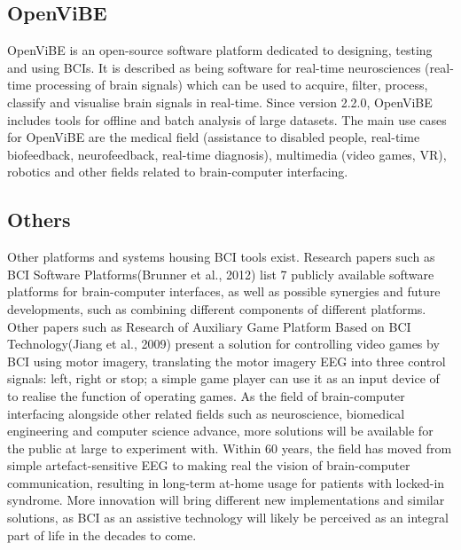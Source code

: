 \subsection{OpenViBE}
OpenViBE is an open-source software platform dedicated to designing, testing and using BCIs. It is described as being software for real-time neurosciences (real-time processing of brain signals) which can be used to acquire, filter, process, classify and visualise brain signals in real-time. Since version 2.2.0, OpenViBE includes tools for offline and batch analysis of large datasets. The main use cases for OpenViBE are the medical field (assistance to disabled people, real-time biofeedback, neurofeedback, real-time diagnosis), multimedia (video games, VR), robotics and other fields related to brain-computer interfacing.

\subsection{Others}
Other platforms and systems housing BCI tools exist. Research papers such as BCI Software Platforms(Brunner et al., 2012) list 7 publicly available software platforms for brain-computer interfaces, as well as possible synergies and future developments, such as combining different components of different platforms\cite{Brunner_2012}. Other papers such as Research of Auxiliary Game Platform Based on BCI Technology(Jiang et al., 2009) present a solution for controlling video games by BCI using motor imagery, translating the motor imagery EEG into three control signals: left, right or stop; a simple game player can use it as an input device of to realise the function of operating games\cite{Jiang_2009}.
\vspace{\baselineskip}\newline
As the field of brain-computer interfacing alongside other related fields such as neuroscience, biomedical engineering and computer science advance, more solutions will be available for the public at large to experiment with. Within 60 years, the field has moved from simple artefact-sensitive EEG to making real the vision of brain-computer communication, resulting in long-term at-home usage for patients with locked-in syndrome\cite{K_bler_2019}. More innovation will bring different new implementations and similar solutions, as BCI as an assistive technology will likely be perceived as an integral part of life in the decades to come\cite{K_bler_2019}.
